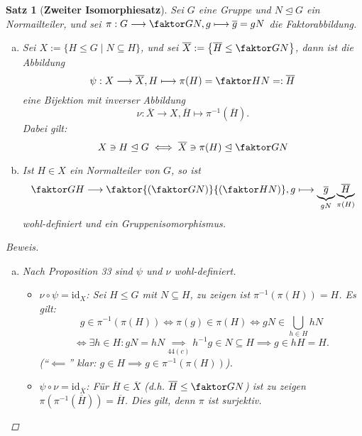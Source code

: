 \documentclass[a4paper]{article}
\theoremstyle{plain}
\newtheorem{satz}[thm]{Satz}
\theoremstyle{definition}
\begin{document}
\begin{satz}[\textbf{Zweiter Isomorphiesatz}]
  Sei $G$ eine Gruppe und $N \trianglelefteq G$ ein Normailteiler, und sei $\pi : G \longrightarrow \faktor GN, g \longmapsto \overline g = gN $ die Faktorabbildung.
  \begin{enumerate}[(a)]
    \item Sei $X:= \{H \le G \mid N \subseteq H\}$, und sei $\overline X := \left\{\overline H \le \faktor GN\right\}$, dann ist die Abbildung $$\psi : X \longrightarrow \overline X, H \longmapsto \pi(H) = \faktor HN =: \overline H$$
          eine Bijektion mit inverser Abbildung $$\nu: \overline X \longrightarrow X, \overline H \longmapsto \pi^{-1}(\overline H).$$
          Dabei gilt:
          $$X \ni H \trianglelefteq G \iff \overline X \ni \pi(H) \trianglelefteq \faktor GN$$
    \item Ist $H \in X$ ein Normalteiler von $G$, so ist
          $$\faktor GH \longrightarrow \faktor{\left(\faktor GN\right)}{\left(\faktor HN \right)}, g \longmapsto \underbrace{\overline g}_{gN} \underbrace{\overline H}_{\pi(H)}$$
          wohl-definiert und ein Gruppenisomorphismus.
  \end{enumerate}
\begin{proof}[Beweis]
  \begin{enumerate}[(a)]
    \item Nach Proposition 33 sind $\psi$ und $\nu$ wohl-definiert.
\begin{itemize}

          \item $\nu \circ \psi = \mathrm{id}_{X}$: Sei $H \le G$ mit $N \subseteq H$, zu zeigen ist $\pi^{-1}(\pi(H)) = H$. Es gilt:
          $$g \in \pi^{-1}(\pi(H)) \iff \pi(g) \in \pi(H) \iff gN \in \bigcup_{h \in H}hN$$
          $$\iff \exists h \in H : gN = hN \underset{44(c)}\implies h^{-1}g \in N \subseteq H \implies g \in hH = H.$$
          (``$\impliedby$'' klar: $g \in H \implies g \in \pi^{-1}(\pi(H))$).

          \item $\psi \circ \nu = \mathrm{id}_{\overline X}$: Für $\overline H \in \overline X$ (d.h. $\overline H \le \faktor GN$) ist zu zeigen $\pi(\pi^{-1}(\overline H)) = \overline H$. Dies gilt, denn $\pi$ ist surjektiv.


\end{itemize}
\end{enumerate}
\end{proof}
\end{satz}
\end{document}
